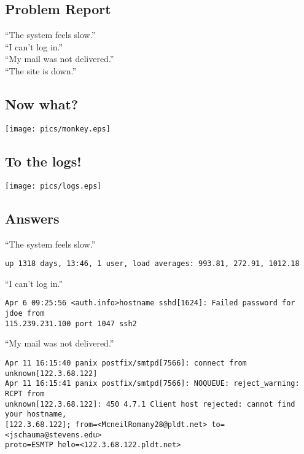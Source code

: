 \documentclass[xga]{xdvislides}
\begin{document}
\subsection{Problem Report}
\vspace*{\fill}
\Huge
\begin{center}
``The system feels slow.'' \\
\addvspace{.5in}
``I can't log in.'' \\
\addvspace{.5in}
``My mail was not delivered.'' \\
\addvspace{.5in}
``The site is down.''
\end{center}
\Normalsize
\vspace*{\fill}

\subsection{Now what?}
\begin{center}
	\texttt{[image: pics/monkey.eps]}
\end{center}

\subsection{To the logs!}
\begin{center}
	\texttt{[image: pics/logs.eps]}
\end{center}

\subsection{Answers}
``The system feels slow.''
\begin{verbatim}
up 1318 days, 13:46, 1 user, load averages: 993.81, 272.91, 1012.18
\end{verbatim}

\addvspace{.3in}
``I can't log in.''
\begin{verbatim}
Apr 6 09:25:56 <auth.info>hostname sshd[1624]: Failed password for jdoe from
115.239.231.100 port 1047 ssh2
\end{verbatim}

\addvspace{.3in}
``My mail was not delivered.''
\begin{verbatim}
Apr 11 16:15:40 panix postfix/smtpd[7566]: connect from unknown[122.3.68.122]
Apr 11 16:15:41 panix postfix/smtpd[7566]: NOQUEUE: reject_warning: RCPT from
unknown[122.3.68.122]: 450 4.7.1 Client host rejected: cannot find your hostname,
[122.3.68.122]; from=<McneilRomany28@pldt.net> to=<jschauma@stevens.edu>
proto=ESMTP helo=<122.3.68.122.pldt.net>
\end{verbatim}
\end{document}
